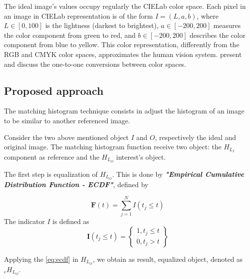 \documentclass{article}
\begin{document}

The ideal image's values occupy regularly the CIELab color space.
Each pixel in an image in CIELab representation is of the form $I= (L, a, b)$, where 
$L\in[0,100]$ is the lightness (darkest to brightest), 
$a\in[-200,200]$ measures the color component from green to red, and 
$b\in[-200,200]$ describes the color component from blue to yellow.
This color representation, differently from the RGB and CMYK color spaces, approximates the human vision system.
\citet{AssessingInformationContentinColorImages} present and discuss the one-to-one conversions between color spaces.


%

\subsection{Proposed approach}
\label{match}
The matching histogram technique consists in adjust the histogram of an image to be similar to another referenced image.

Consider the two above mentioned object $I$ and $O$, respectively the ideal and original image. The matching histogram function receive two object: the $H_{L_I}$ component as reference and the $H_{L_O}$ interest's object. 

The first step is equalization of $H_{L_O}$. This is done by \textbf{\textit{"Empirical Cumulative Distribution Function - ECDF"}}, defined by 

\begin{equation}
    \bm F(t) = \sum_{j=1}^N I(t_j \leq t) 
    \label{eq:ecdf}
\end{equation}
The indicator $I$ is defined as
\begin{equation}
    \bm I(t_j \leq t) = \begin{Bmatrix}
        1,  t_j \leq t \\
        0,  t_j > t
    \end{Bmatrix}
\end{equation}

Applying the \ref{eq:ecdf} in $H_{L_O}$, we obtain as result, equalized object, denoted as $_eH_{L_O}$. 
\end{document}

